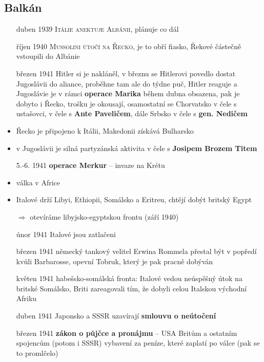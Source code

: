 \documentclass{article}
\begin{document}
\subsection*{Balkán}
\begin{itemize}
    \item[duben 1939] \textsc{Itálie anektuje Albánii}, plánuje co dál
    \item[říjen 1940] \textsc{Mussolini útočí na Řecko}, je to obří fiasko, Řekové částečně vstoupili do Albánie
    \item[březen 1941] Hitler si je nakláněl, v březnu se Hitlerovi povedlo dostat Jugoslávii do aliance, proběhne tam ale do týdne puč, Hitler reaguje a Jugoslávie je v rámci \textbf{operace Marika} během dubna obsazena, pak je dobyto i Řecko, trošku je okousají, osamostatní se Chorvatsko v čele s ustašovci, v čele s \textbf{Ante Paveličem}, dále Srbsko v čele s \textbf{gen. Nedičem}
    \item Řecko je připojeno k Itálii, Makedonii získává Bulharsko
    \item v Jugoslávii je silná partyzánská aktivita v čele s \textbf{Josipem Brozem Titem}
    \item[5.-6. 1941] \textbf{operace Merkur} -- invaze na Krétu
    \item válka v Africe
    \item Italové drží Libyi, Ethiopii, Somálsko a Eritreu, chtějí dobýt britský Egypt
    \item[$\Rightarrow$] otevíráme libyjsko-egyptskou frontu (září 1940)
    \item[únor 1941] Italové jsou zatlačeni
    \item[březen 1941] německý tankový velitel Erwina Rommela přestal být v popředí kvůli Barbarosse, opevní Tobruk, který je pak pracně dobýván
    \item[květen 1941] habešsko-somálská fronta: Italové vedou neúspěšný útok na britské Somálsko, Briti zareagovali tím, že dobyli celou Italskou východní Afriku
    \item[duben 1941] Japonsko a SSSR uzavírají \textbf{smlouvu o neútočení}
    \item[březen 1941] \textbf{zákon o půjčce a pronájmu} -- USA  Britům a ostatním spojencům (potom i SSSR) vybavení za peníze, které zaplatí po válce (pak se to promlčelo)
\end{itemize}
\end{document}
